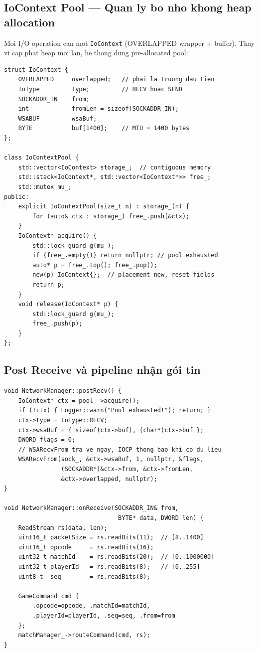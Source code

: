 \documentclass[12pt,a4paper]{report}
\begin{document}
\subsection{IoContext Pool --- Quan ly bo nho khong heap allocation}

Moi I/O operation can mot \texttt{IoContext} (OVERLAPPED wrapper + buffer). Thay vi cap phat heap moi lan, he thong dung pre-allocated pool:

\begin{lstlisting}[style=cppStyle, caption={IoContext pool --- zero heap allocation khi running}, label={lst:iopool}]
struct IoContext {
    OVERLAPPED     overlapped;   // phai la truong dau tien
    IoType         type;         // RECV hoac SEND
    SOCKADDR_IN    from;
    int            fromLen = sizeof(SOCKADDR_IN);
    WSABUF         wsaBuf;
    BYTE           buf[1400];    // MTU = 1400 bytes
};

class IoContextPool {
    std::vector<IoContext> storage_;  // contiguous memory
    std::stack<IoContext*, std::vector<IoContext*>> free_;
    std::mutex mu_;
public:
    explicit IoContextPool(size_t n) : storage_(n) {
        for (auto& ctx : storage_) free_.push(&ctx);
    }
    IoContext* acquire() {
        std::lock_guard g(mu_);
        if (free_.empty()) return nullptr; // pool exhausted
        auto* p = free_.top(); free_.pop();
        new(p) IoContext{};  // placement new, reset fields
        return p;
    }
    void release(IoContext* p) {
        std::lock_guard g(mu_);
        free_.push(p);
    }
};
\end{lstlisting}

\subsection{Post Receive và pipeline nhận gói tin}

\begin{lstlisting}[style=cppStyle, caption={Post overlapped receive và xử lý datagram}, label={lst:recv}]
void NetworkManager::postRecv() {
    IoContext* ctx = pool_->acquire();
    if (!ctx) { Logger::warn("Pool exhausted!"); return; }
    ctx->type = IoType::RECV;
    ctx->wsaBuf = { sizeof(ctx->buf), (char*)ctx->buf };
    DWORD flags = 0;
    // WSARecvFrom tra ve ngay, IOCP thong bao khi co du lieu
    WSARecvFrom(sock_, &ctx->wsaBuf, 1, nullptr, &flags,
                (SOCKADDR*)&ctx->from, &ctx->fromLen,
                &ctx->overlapped, nullptr);
}

void NetworkManager::onReceive(SOCKADDR_IN& from,
                                BYTE* data, DWORD len) {
    ReadStream rs(data, len);
    uint16_t packetSize = rs.readBits(11);  // [8..1400]
    uint16_t opcode     = rs.readBits(16);
    uint32_t matchId    = rs.readBits(20);  // [0..1000000]
    uint32_t playerId   = rs.readBits(8);   // [0..255]
    uint8_t  seq        = rs.readBits(8);

    GameCommand cmd {
        .opcode=opcode, .matchId=matchId,
        .playerId=playerId, .seq=seq, .from=from
    };
    matchManager_->routeCommand(cmd, rs);
}
\end{lstlisting}
\end{document}
